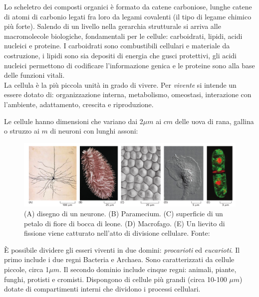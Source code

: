 \par Lo scheletro dei composti organici è formato da catene carboniose, lunghe catene di atomi di carbonio legati fra loro da legami covalenti (il tipo di legame chimico più forte). Salendo di un livello nella gerarchia strutturale si arriva alle macromolecole biologiche, fondamentali per le cellule: carboidrati, lipidi, acidi nucleici e proteine. I carboidrati sono combustibili cellulari e materiale da costruzione, i lipidi sono sia depositi di energia che gusci protettivi, gli acidi nucleici permettono di codificare l'informazione genica e le proteine sono alla base delle funzioni vitali.\\

La cellula è la più piccola unità in grado di vivere. Per \textit{vivente} si intende un essere dotato di: organizzazione interna, metabolismo, omeostasi, interazione con l'ambiente, adattamento, crescita e riproduzione.

\par Le cellule hanno dimensioni che variano dai 2$\mu m$ ai $cm$ delle uova di rana, gallina o struzzo ai $m$ di neuroni con lunghi assoni:

\begin{figure}[!h]
	\centering
	\includegraphics[scale=0.5] {images/cellule-dimensioni.png}
	\caption{(A) disegno di un neurone. (B) Paramecium. (C) superficie di un petalo di fiore di bocca di leone. (D) Macrofago. (E) Un lievito di fissione viene catturato nell'atto di divisione cellulare. Fonte: \cite{alberts2018essential}}
	\label{fig:cellule-dimensioni}
\end{figure}

\par È possibile dividere gli esseri viventi in due domini: \textit{procarioti} ed \textit{eucarioti}. Il primo include i due regni Bacteria e Archaea. Sono caratterizzati da cellule piccole, circa 1$\mu m$. Il secondo dominio include cinque regni: animali, piante, funghi, protisti e cromisti. Dispongono di cellule più grandi (circa 10-100 $\mu m$) dotate di compartimenti interni che dividono i processi cellulari.

